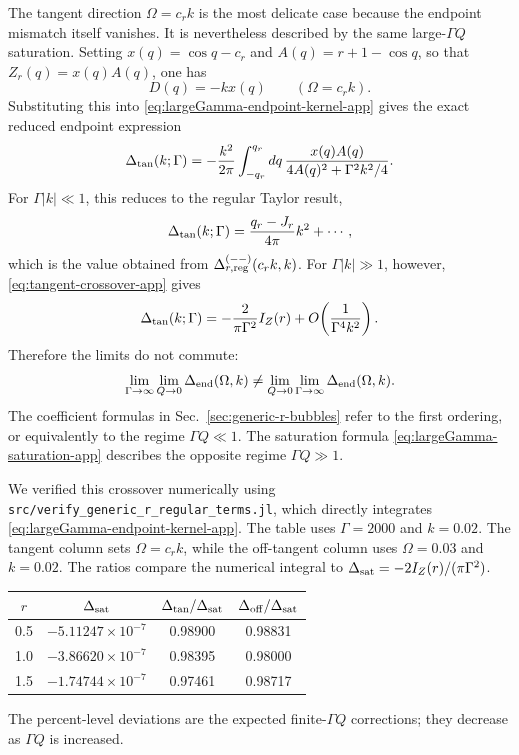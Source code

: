 \documentclass[aps,prx,preprint,amsmath,amssymb]{revtex4-2}
\begin{document}
The tangent direction \(\Omega=c_rk\) is the most delicate case because the
endpoint mismatch itself vanishes.  It is nevertheless described by the same
large-\(\Gamma Q\) saturation.  Setting \(x(q)=\cos q-c_r\) and
\(A(q)=r+1-\cos q\), so that \(Z_r(q)=x(q)A(q)\), one has
\[
D(q)=-kx(q)
\qquad
(\Omega=c_rk).
\]
Substituting this into \eqref{eq:largeGamma-endpoint-kernel-app} gives the
exact reduced endpoint expression
\begin{equation}
\label{eq:tangent-crossover-app}
\Delta_{\rm tan}(k;\Gamma)
=
-\frac{k^2}{2\pi}
\int_{-q_r}^{q_r}dq\,
\frac{x(q)A(q)}
{4A(q)^2+\Gamma^2k^2/4}.
\end{equation}
For \(\Gamma|k|\ll1\), this reduces to the regular Taylor result,
\begin{equation}
\Delta_{\rm tan}(k;\Gamma)
=
\frac{q_r-J_r}{4\pi}k^2+\cdots,
\end{equation}
which is the value obtained from
\(\Delta_{r,\rm reg}^{(--)}(c_rk,k)\).  For \(\Gamma|k|\gg1\), however,
\eqref{eq:tangent-crossover-app} gives
\begin{equation}
\label{eq:tangent-largeGamma-app}
\Delta_{\rm tan}(k;\Gamma)
=
-\frac{2}{\pi\Gamma^2}I_Z(r)
+O\!\left(\frac{1}{\Gamma^4k^2}\right).
\end{equation}
Therefore the limits do not commute:
\[
\lim_{\Gamma\to\infty}\lim_{Q\to0}
\Delta_{\rm end}(\Omega,k)
\neq
\lim_{Q\to0}\lim_{\Gamma\to\infty}
\Delta_{\rm end}(\Omega,k).
\]
The coefficient formulas in Sec.~\ref{sec:generic-r-bubbles} refer to the
first ordering, or equivalently to the regime \(\Gamma Q\ll1\).  The
saturation formula \eqref{eq:largeGamma-saturation-app} describes the opposite
regime \(\Gamma Q\gg1\).

We verified this crossover numerically using
\texttt{src/verify\_generic\_r\_regular\_terms.jl}, which directly integrates
\eqref{eq:largeGamma-endpoint-kernel-app}.  The table uses
\(\Gamma=2000\) and \(k=0.02\).  The tangent column sets
\(\Omega=c_rk\), while the off-tangent column uses \(\Omega=0.03\) and
\(k=0.02\).  The ratios compare the numerical integral to
\(\Delta_{\rm sat}=-2I_Z(r)/(\pi\Gamma^2)\).
\begin{center}
\begin{tabular}{cccc}
\toprule
\(r\) &
\(\Delta_{\rm sat}\) &
\(\Delta_{\rm tan}/\Delta_{\rm sat}\) &
\(\Delta_{\rm off}/\Delta_{\rm sat}\) \\
\midrule
0.5 & \(-5.11247\times10^{-7}\) & 0.98900 & 0.98831 \\
1.0 & \(-3.86620\times10^{-7}\) & 0.98395 & 0.98000 \\
1.5 & \(-1.74744\times10^{-7}\) & 0.97461 & 0.98717 \\
\bottomrule
\end{tabular}
\end{center}
The percent-level deviations are the expected finite-\(\Gamma Q\) corrections;
they decrease as \(\Gamma Q\) is increased.
\end{document}
